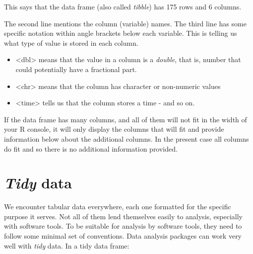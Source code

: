 \documentclass[
  12pt,
  letterpaper,
  DIV=11,
  numbers=noendperiod]{scrreprt}
\begin{document}
This says that the data frame (also called \emph{tibble}) has 175 rows
and 6 columns.

The second line mentions the column (variable) names. The third line has
some specific notation within angle brackets below each variable. This
is telling us what type of value is stored in each column.

\begin{itemize}
\item
  \textless dbl\textgreater{} means that the value in a column is a
  \emph{double}, that is, number that could potentially have a
  fractional part.
\item
  \textless chr\textgreater{} means that the column has character or
  non-numeric values
\item
  \textless time\textgreater{} tells us that the column stores a time -
  and so on.
\end{itemize}

If the data frame has many columns, and all of them will not fit in the
width of your R console, it will only display the columns that will fit
and provide information below about the additional columns. In the
present case all columns do fit and so there is no additional
information provided.

\section{\texorpdfstring{\emph{Tidy} data}{Tidy data}}\label{tidy-data}

We encounter tabular data everywhere, each one formatted for the
specific purpose it serves. Not all of them lend themselves easily to
analysis, especially with software tools. To be suitable for analysis by
software tools, they need to follow some minimal set of conventions.
Data analysis packages can work very well with \emph{tidy} data. In a
tidy data frame:
\end{document}

